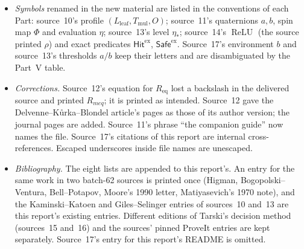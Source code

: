\documentclass[11pt,letterpaper]{article}
\numberwithin{equation}{section}
\theoremstyle{definition}
\theoremstyle{remark}
\newcommand{\Lleaf}{L_{\mathrm{leaf}}}
\newcommand{\Tmul}{T_{\mathrm{mul}}}
\newcommand{\etastar}{\eta_*}
\newcommand{\ReLU}{\operatorname{ReLU}}
\newcommand{\HitEx}{\mathsf{Hit}^{\mathrm{ex}}}
\newcommand{\SafeEx}{\mathsf{Safe}^{\mathrm{ex}}}
\begin{document}
\begin{itemize}
existing research questions and to one existing example; no existing label was
renamed.
\item \emph{Symbols} renamed in the new material are listed in the conventions of
each Part: source~10's profile $(\Lleaf,\Tmul,O)$; source~11's quaternions
$a,b$, spin map $\Phi$ and evaluation $\eta$; source~13's level $\etastar$;
source~14's $\ReLU$ (the source printed $\rho$) and exact predicates $\HitEx$,
$\SafeEx$. Source~17's environment $b$ and source~13's thresholds $a/b$ keep
their letters and are disambiguated by the Part~V table.
\item \emph{Corrections.} Source~12's equation for $R_{\mathrm{eq}}$ lost a
backslash in the delivered source and printed $R_{meq}$; it is printed as
intended. Source~12 gave the Delvenne--K\r{u}rka--Blondel article's pages as those
of its author version; the journal pages are added. Source~11's phrase ``the
companion guide'' now names the file. Source~17's citations of this report are
internal cross-references. Escaped underscores inside file names are unescaped.
\item \emph{Bibliography.} The eight lists are appended to this report's. An
entry for the same work in two batch-62 sources is printed once (Higman,
Bogopolski--Ventura, Bell--Potapov, Moore's 1990 letter, Matiyasevich's 1970
note), and the Kaminski--Katoen and Giles--Selinger entries of sources~10 and~13
are this report's existing entries. Different editions of Tarski's decision
method (sources~15 and~16) and the sources' pinned ProveIt entries are kept
separately. Source~17's entry for this report's README is omitted.
\end{itemize}
\end{document}
